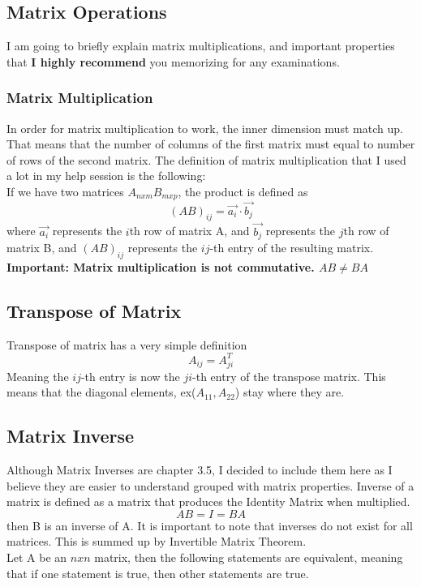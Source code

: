 \documentclass[12pt]{article}
\begin{document}
\subsection{Matrix Operations}
I am going to briefly explain matrix multiplications, and important properties that \textbf{I highly recommend} you memorizing for any examinations. 
\subsubsection{Matrix Multiplication}
In order for matrix multiplication to work, the inner dimension must match up. That means that the number of columns of the first matrix must equal to number of rows of the second matrix. 
The definition of matrix multiplication that I used a lot in my help session is the following:\\
If we have two matrices $A_{nxm}B_{mxp}$, the product is defined as
\begin{equation}
(AB)_{ij}  = \vec{a_i} \cdot \vec{b_j} 
\end{equation}
where $\vec{a_i}$ represents the $i$th row of matrix A, and $\vec{b_j}$ represents the $j$th row of matrix B, and $(AB)_{ij}$ represents the $ij$-th entry of the resulting matrix. \\
\textbf{Important: Matrix multiplication is not commutative. $AB \neq BA$}

\subsection{Transpose of Matrix}
Transpose of matrix has a very simple definition
\begin{equation}
A_{ij} = A^{T}_{ji}
\end{equation}
Meaning the $ij$-th entry is now the $ji$-th entry of the transpose matrix. This means that the diagonal elements, ex($A_{11}, A_{22}$) stay where they are.

\subsection{Matrix Inverse}
Although Matrix Inverses are chapter 3.5, I decided to include them here as I believe they are easier to understand grouped with matrix properties. Inverse of a matrix is defined as a matrix that produces the Identity Matrix when multiplied. 
\begin{equation}
AB = I = BA
\end{equation}
then B is an inverse of A.
It is important to note that inverses do not exist for all matrices. This is summed up by Invertible Matrix Theorem.\\
Let A be an $nxn$ matrix, then the following statements are equivalent, meaning that if one statement is true, then other statements are true.
\end{document}
